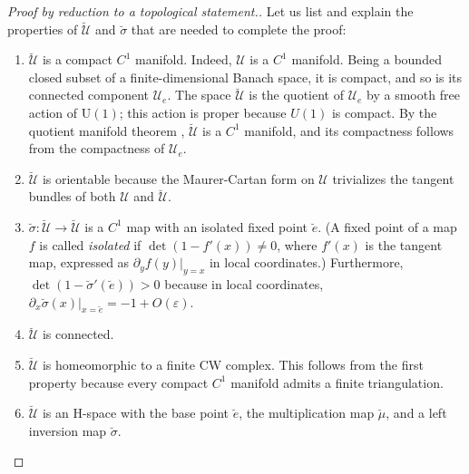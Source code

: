 \documentclass[12pt]{article}
\newcommand{\calU}{\mathcal{U}}
\newcommand{\UU}{\mathrm{U}}
\newcommand{\eps}{\varepsilon}
\newtheorem[definition]{Definition}[Theorem]{Definition}
\newtheorem[remark]{Example}[Theorem]{Example}
\newtheorem[remark]{Remark}[Theorem]{Remark}
\newtheorem[remark]{Question}[Theorem]{Open question}
\newtheorem*[definition]{definition}{Definition}
\newtheorem*[remark]{example}{Example}
\newtheorem*[remark]{remark}{Remark}
\newtheorem*[remark]{question}{Open question}
\numberwithin{equation}{section}
\begin{document}
\begin{proof}[Proof by reduction to a topological statement.]
Let us list and explain the properties of $\breve{\calU}$ and $\breve{\sigma}$ that are needed to complete the proof:
\begin{enumerate}
\item $\breve{\calU}$ is a compact $C^1$ manifold. Indeed, $\calU$ is a $C^1$ manifold. Being a bounded closed subset of a finite-dimensional Banach space, it is compact, and so is its connected component $\calU_e$. The space $\breve{\calU}$ is the quotient of $\calU_e$ by a smooth free action of $\UU(1)$; this action is proper because $U(1)$ is compact. By the quotient manifold theorem \cite[theorem~21.10]{Lee-sm}, $\breve{\calU}$ is a $C^1$ manifold, and its compactness follows from the compactness of $\calU_e$.
\item $\breve{\calU}$ is orientable because the Maurer-Cartan form on $\calU$ trivializes the tangent bundles of both $\calU$ and $\breve{\calU}$.
\item $\breve{\sigma}\colon \breve{\calU}\to\breve{\calU}$ is a $C^1$ map with an isolated fixed point $\breve{e}$. (A fixed point of a map $f$ is called \emph{isolated} if $\det(1-f'(x))\not=0$, where $f'(x)$ is the tangent map, expressed as $\partial_yf(y)|_{y=x}$ in local coordinates.) Furthermore, $\det(1-\breve{\sigma}'(\breve{e}))>0$ because in local coordinates, $\partial_x\breve{\sigma}(x)|_{x=\breve{e}}=-1+O(\eps)$.
\item $\breve{\calU}$ is connected.
\item $\breve{\calU}$ is homeomorphic to a finite CW complex. This follows from the first property because every compact $C^1$ manifold admits a finite triangulation.
\item $\breve{\calU}$ is an H-space with the base point $\breve{e}$, the multiplication map $\breve{\mu}$, and a left inversion map $\breve{\sigma}$.
\end{enumerate}


\end{proof}
\end{document}
